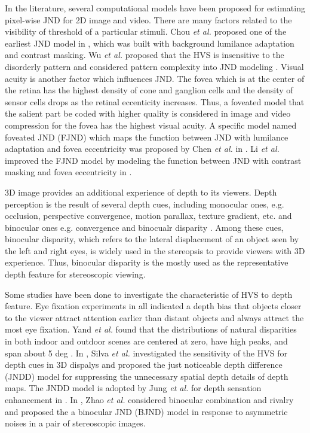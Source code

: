 \documentclass[journal]{IEEEtran}
\begin{document}
In the literature, several computational models have been proposed for estimating pixel-wise JND for 2D image and video. There are many factors related to the visibility of threshold of a particular stimuli. Chou \textit{et al.} proposed one of the earliest JND model in \cite{RN634}, which was built with background lumilance adaptation and contrast masking. Wu \textit{et al.} proposed that the HVS is insensitive to the disorderly pattern and considered pattern complexity into JND modeling \cite{RN649, RN639, Wu2017Enhanced}. Visual acuity is another factor which influences JND. The fovea which is at the center of the retina has the highest density of cone and ganglion cells and the density of sensor cells drops as the retinal eccenticity increases. Thus, a foveated model that the salient part be coded with higher quality is considered in image and video compression \cite{RN652, RN650} for the fovea has the highest visual acuity. A specific model named foveated JND (FJND) which maps the function between JND with lumilance adaptation and fovea eccentricity was proposed by Chen \textit{et al.} in \cite{RN635}. Li \textit{et al.} improved the FJND model by modeling the function between JND with contrast masking and fovea eccentricity in \cite{RN633}.

3D image provides an additional experience of depth to its viewers. Depth perception is the result of several depth cues, including monocular ones, e.g. occlusion, perspective convergence, motion parallax, texture gradient, etc. and binocular ones e.g. convergence and binocualr disparity \cite{RN631}. Among these cues, binocular disparity, which refers to the lateral displacement of an object seen by the left and right eyes, is widely used in the stereopsis to provide viewers with 3D experience. Thus, binocular disparity is the mostly used as the representative depth feature for stereoscopic viewing. 

Some studies have been done to investigate the characteristic of HVS to depth feature. Eye fixation experiments in \cite{RN150,RN138,RN148} all indicated a depth bias that objects closer to the viewer attract attention earlier than distant objects and always attract the most eye fixation. Yand \textit{et al.} found that the distributions of natural disparities in both indoor and outdoor scenes are centered at zero, have high peaks, and span about 5 deg \cite{RN607}. In \cite{RN641, RN644}, Silva \textit{et al.} investigated the sensitivity of the HVS for depth cues in 3D dispalys and proposed the just noticeable depth difference (JNDD) model for suppressing the unnecessary spatial depth details of depth maps. The JNDD model is adopted by Jung \textit{et al.} for depth sensation enhancement in \cite{RN643,RN640}. In \cite{RN637}, Zhao \textit{et al.} considered binocular combination and rivalry and proposed the a binocular JND (BJND) model in response to asymmetric noises in a pair of stereoscopic images.
\end{document}
